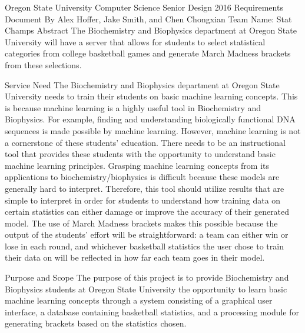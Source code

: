 \documentclass[letterpaper, 10pt,titlepage]{article}
\begin{document}
\begin{center}

Oregon State University Computer Science Senior Design 2016
\bigbreak
Requirements Document
\bigbreak
By Alex Hoffer, Jake Smith, and Chen Chongxian
\bigbreak
Team Name: Stat Champs
\bigbreak
\vspace{3.0cm}
 Abstract
\bigbreak
The Biochemistry and Biophysics department at Oregon State University will have a server that allows for students to select statistical categories from college basketball games and generate March Madness brackets from these selections.
\newpage
\end{center}





\begin{section}{Service Need}
The Biochemistry and Biophysics department at Oregon State University needs to train their students on basic machine learning concepts. This is because machine learning is a highly useful tool in Biochemistry and Biophysics. For example, finding and understanding biologically functional DNA sequences is made possible by machine learning. However, machine learning is not a cornerstone of these students’ education. There needs to be an instructional tool that provides these students with the opportunity to understand basic machine learning principles. Grasping machine learning concepts from its applications to biochemistry/biophysics is difficult because these models are generally hard to interpret. Therefore, this tool should utilize results that are simple to interpret in order for students to understand how training data on certain statistics can either damage or improve the accuracy of their generated model. The use of March Madness brackets makes this possible because the output of the students’ effort will be straightforward: a team can either win or lose in each round, and whichever basketball statistics the user chose to train their data on will be reflected in how far each team goes in their model.
\end{section}


\begin{section}{Purpose and Scope}
The purpose of this project is to provide Biochemistry and Biophysics students at Oregon State University the opportunity to learn basic machine learning concepts through a system consisting of a graphical user interface, a database containing basketball statistics, and a processing module for generating brackets based on the statistics chosen.


\end{section}
\end{document}
